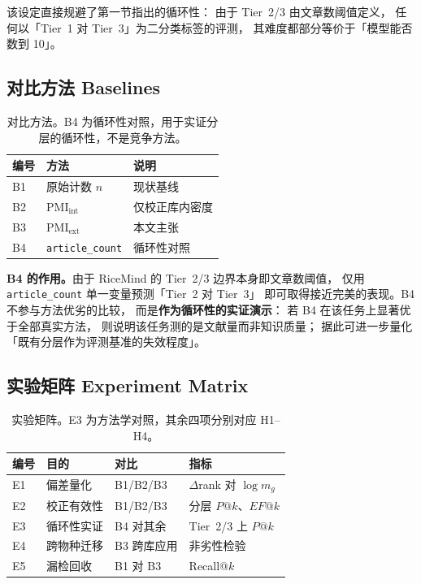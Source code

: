 \documentclass[conference]{IEEEtran}
\begin{document}
该设定直接规避了第一节指出的循环性：
由于 Tier~2/3 由文章数阈值定义，
任何以「Tier~1 对 Tier~3」为二分类标签的评测，
其难度都部分等价于「模型能否数到 10」。

\subsection{对比方法 Baselines}

\begin{table}[h]
  \centering
  \small
  \caption{对比方法。B4 为循环性对照，用于实证分层的循环性，不是竞争方法。}
  \label{tab:baselines}
  \begin{tabular}{lll}
    \toprule
    编号 & 方法 & 说明 \\
    \midrule
    B1 & 原始计数 $n$ & 现状基线 \\
    B2 & $\mathrm{PMI}_{\text{int}}$ & 仅校正库内密度 \\
    B3 & $\mathrm{PMI}_{\text{ext}}$ & 本文主张 \\
    \midrule
    B4 & \texttt{article\_count} & 循环性对照 \\
    \bottomrule
  \end{tabular}
\end{table}

\textbf{B4 的作用。}由于 RiceMind 的 Tier~2/3 边界本身即文章数阈值，
仅用 \texttt{article\_count} 单一变量预测「Tier~2 对 Tier~3」
即可取得接近完美的表现。B4 不参与方法优劣的比较，
而是\textbf{作为循环性的实证演示}：
若 B4 在该任务上显著优于全部真实方法，
则说明该任务测的是文献量而非知识质量；
据此可进一步量化「既有分层作为评测基准的失效程度」。

\subsection{实验矩阵 Experiment Matrix}

\begin{table}[h]
  \centering
  \small
  \caption{实验矩阵。E3 为方法学对照，其余四项分别对应 H1--H4。}
  \label{tab:matrix}
  \begin{tabular}{llll}
    \toprule
    编号 & 目的 & 对比 & 指标 \\
    \midrule
    E1 & 偏差量化 & B1/B2/B3 & $\Delta$rank 对 $\log m_g$ \\
    E2 & 校正有效性 & B1/B2/B3 & 分层 $P@k$、$EF@k$ \\
    E3 & 循环性实证 & B4 对其余 & Tier~2/3 上 $P@k$ \\
    E4 & 跨物种迁移 & B3 跨库应用 & 非劣性检验 \\
    E5 & 漏检回收 & B1 对 B3 & Recall@$k$ \\
    \bottomrule
  \end{tabular}
\end{table}
\end{document}

